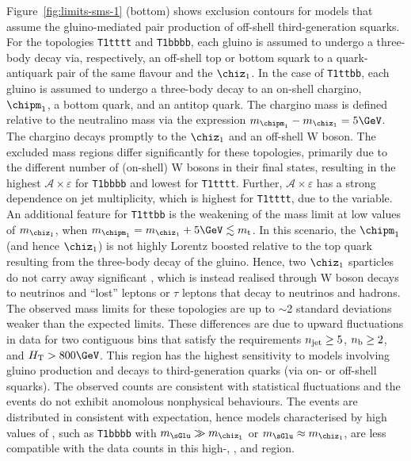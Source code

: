Figure~\ref{fig:limits-sms-1} (bottom) shows exclusion contours for
models that assume the gluino-mediated pair production of off-shell
third-generation squarks. For the topologies \texttt{T1tttt} and
\texttt{T1bbbb}, each gluino is assumed to undergo a three-body decay
via, respectively, an off-shell top or bottom squark to a
quark-antiquark pair of the same flavour and the $\chiz_1$. In the
case of \texttt{T1ttbb}, each gluino is assumed to undergo a
three-body decay to an on-shell chargino, $\chipm_1$, a bottom quark,
and an antitop quark. The chargino mass is defined relative to the
neutralino mass via the expression $m_{\chipm_1} - m_{\chiz_1} =
5\GeV$. The chargino decays promptly to the $\chiz_1$ and an off-shell
W boson. The excluded mass regions differ significantly for these
topologies, primarily due to the different number of (on-shell) W
bosons in their final states, resulting in the highest $\mathcal{A}
\times \varepsilon$ for \texttt{T1bbbb} and lowest for
\texttt{T1tttt}. Further, $\mathcal{A} \times \varepsilon$ has a
strong dependence on jet multiplicity, which is highest for
\texttt{T1tttt}, due to the \bdphi variable. An additional feature for
\texttt{T1ttbb} is the weakening of the mass limit at low values of
$m_{\chiz_1}$, when $m_{\chipm_1} = m_{\chiz_1} + 5\GeV \lesssim
m_\text{t}$. In this scenario, the $\chipm_1$ (and hence $\chiz_1$) is
not highly Lorentz boosted relative to the top quark resulting from
the three-body decay of the gluino. Hence, two $\chiz_1$ sparticles do
not carry away significant \ptvecmiss, which is instead realised
through W boson decays to neutrinos and ``lost'' leptons or $\tau$
leptons that decay to neutrinos and hadrons. The observed mass limits
for these topologies are up to $\sim$2 standard deviations weaker than
the expected limits. These differences are due to upward fluctuations
in data for two contiguous bins that satisfy the requirements $n_{\text{jet}}
\geq 5$, $n_{\text{b}} \geq 2$, and $\scalht > 800\GeV$. This region has the
highest sensitivity to models involving gluino production and decays
to third-generation quarks (via on- or off-shell squarks). The
observed counts are consistent with statistical fluctuations and the
events do not exhibit anomolous nonphysical behaviours. The events are
distributed in \HTmiss consistent with expectation, hence models
characterised by high values of \HTmiss, such as \texttt{T1bbbb} with
$m_{\sGlu} \gg m_{\chiz_1}$ or $m_{\sGlu} \approx m_{\chiz_1}$, are
less compatible with the data counts in this high-\njet, \nb, and
\scalht region.

